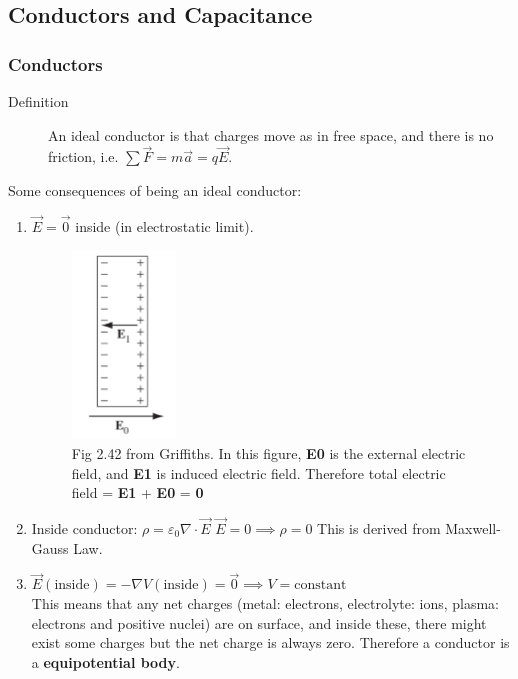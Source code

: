 \documentclass[12pt,a4paper,twoside]{article}
\begin{document}
\subsection{Conductors and Capacitance}
\subsubsection{Conductors}
    \begin{description}
        \item[Definition] An ideal conductor is that charges move as in free space, and there is no friction, i.e. $\sum \overrightarrow{F}=m\overrightarrow{a}=q\overrightarrow{E}$.
    \end{description}
    Some consequences of being an ideal conductor:
    \begin{enumerate}
        \item $\overrightarrow{E}=\overrightarrow{0}$ inside (in electrostatic limit).
        \begin{figure}[ht]
            \centering
            \includegraphics[height=5cm]{250-Revision/fig-2.42.png}
            \caption{Fig 2.42 from Griffiths. In this figure, \textbf{E0} is the external electric field, and \textbf{E1} is induced electric field. Therefore total electric field = \textbf{E1} + \textbf{E0} = \textbf{0}}
            \label{fig:2.42}
        \end{figure}
        \item Inside conductor:
            \subitem \(\rho=\varepsilon_0\nabla \cdot \overrightarrow{E}\)
            \subitem \(\overrightarrow{E}=0\implies\rho=0\)
            \subitem This is derived from Maxwell-Gauss Law.
        
        \item \(\overrightarrow{E}(\mathrm{inside})=-\nabla V(\mathrm{inside})=\overrightarrow{0}\implies V=\mathrm{constant}\)\\
        This means that any net charges (metal: electrons, electrolyte: ions, plasma: electrons and positive nuclei) are on surface, and inside these, there might exist some charges but the net charge is always zero. Therefore a conductor is a \textbf{equipotential body}.
        

\end{enumerate}
\end{document}
